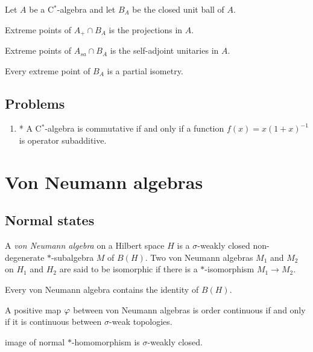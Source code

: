 \documentclass{../../large}
\begin{document}
\begin{prb}
Let $A$ be a C$^*$-algebra and let $B_A$ be the closed unit ball of $A$.
\begin{parts}
\item Extreme points of $A_+\cap B_A$ is the projections in $A$.
\item Extreme points of $A_{sa}\cap B_A$ is the self-adjoint unitaries in $A$.
\item Every extreme point of $B_A$ is a partial isometry.
\end{parts}
\end{prb}

\section*{Problems}
\begin{enumerate}
\item* A C$^*$-algebra is commutative if and only if a function $f(x)=x(1+x)^{-1}$ is operator subadditive.
\end{enumerate}







\chapter{Von Neumann algebras}

\section{Normal states}

\begin{prb}
A \emph{von Neumann algebra} on a Hilbert space $H$ is a $\sigma$-weakly closed non-degenerate $*$-subalgebra $M$ of $B(H)$.
Two von Neumann algebras $M_1$ and $M_2$ on $H_1$ and $H_2$ are said to be isomorphic if there is a $*$-isomorphism $M_1\to M_2$.
\begin{parts}
\item Every von Neumann algebra contains the identity of $B(H)$.
\item A positive map $\varphi$ between von Neumann algebras is order continuous if and only if it is continuous between $\sigma$-weak topologies.
\item image of normal $*$-homomorphism is $\sigma$-weakly closed.
\end{parts}
\end{prb}
\end{document}
